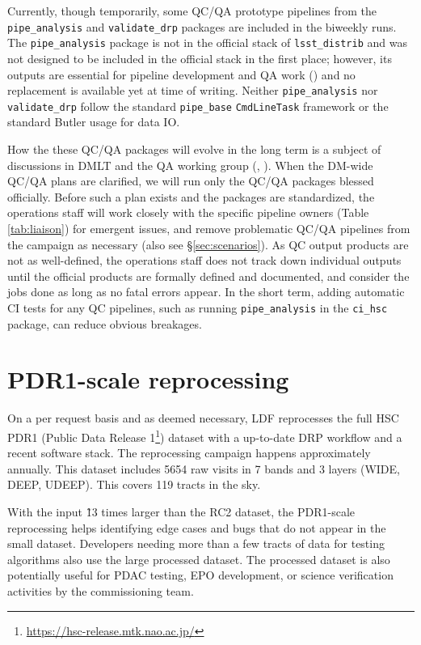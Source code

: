 \documentclass[DM,authoryear,toc]{lsstdoc}
\begin{document}
Currently, though temporarily, some QC/QA prototype pipelines from the
\texttt{pipe\_analysis} and \texttt{validate\_drp} packages are included in
the biweekly runs. The \texttt{pipe\_analysis} package is not in the official
stack of \texttt{lsst\_distrib} and was not designed to be included in the
official stack in the first place; however, its outputs are essential
for pipeline development and QA work () and no replacement
is available yet at time of writing.  Neither \texttt{pipe\_analysis} nor
\texttt{validate\_drp} follow the standard \texttt{pipe\_base}
\texttt{CmdLineTask} framework or the standard Butler usage for data IO.

How the these QC/QA packages will evolve in the long term is a subject of
discussions in DMLT and the QA working group (, ).
When the DM-wide QC/QA plans are clarified, we will run only the QC/QA packages
blessed officially. Before such a plan exists and the packages are standardized,
the operations staff will work closely with the specific pipeline owners
(Table \ref{tab:liaison}) for emergent issues, and remove problematic
QC/QA pipelines from the campaign as necessary (also see \S \ref{sec:scenarios}).
As QC output products are not as well-defined, the operations
staff does not track down individual outputs until the official products
are formally defined and documented,
and consider the jobs done as long as no fatal errors appear.  In
the short term, adding automatic CI tests for any QC pipelines,
such as running \texttt{pipe\_analysis}
in the \texttt{ci\_hsc} package, can reduce obvious breakages.

\section{PDR1-scale reprocessing}
\label{sec:pdr1}

On a per request basis and as deemed necessary, LDF reprocesses the
full HSC PDR1 (Public Data Release 1\footnote{\url{https://hsc-release.mtk.nao.ac.jp/}})
dataset with a up-to-date DRP
workflow and a recent software stack. The reprocessing campaign
happens approximately annually. This dataset includes 5654 raw
visits in 7 bands and 3 layers (WIDE, DEEP, UDEEP). This covers 119
tracts in the sky.

With the input \~13 times larger than the RC2 dataset, the PDR1-scale
reprocessing helps identifying edge cases and bugs that do not
appear in the small dataset.  Developers needing more than a few
tracts of data for testing algorithms also use the large processed
dataset. The processed dataset is also potentially useful for PDAC
testing, EPO development, or science verification activities by the
commissioning team.
\end{document}
